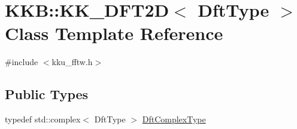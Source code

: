 \hypertarget{class_k_k_b_1_1_k_k___d_f_t2_d}{}\section{K\+KB\+:\+:K\+K\+\_\+\+D\+F\+T2D$<$ Dft\+Type $>$ Class Template Reference}
\label{class_k_k_b_1_1_k_k___d_f_t2_d}


{\ttfamily \#include $<$kku\+\_\+fftw.\+h$>$}

\subsection*{Public Types}
\begin{DoxyCompactItemize}
\item 
typedef std\+::complex$<$ Dft\+Type $>$ \hyperlink{class_k_k_b_1_1_k_k___d_f_t2_d_a3277abaea54d0d88958f030092b9ac38}{Dft\+Complex\+Type}
\end{DoxyCompactItemize}
